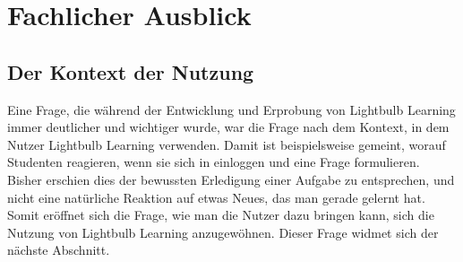 \section{Fachlicher Ausblick}
\subsection{Der Kontext der Nutzung}
Eine Frage, die während der Entwicklung und Erprobung von Lightbulb Learning immer deutlicher und wichtiger wurde, war die Frage nach dem Kontext, in dem Nutzer Lightbulb Learning verwenden. Damit ist beispielsweise gemeint, worauf Studenten reagieren, wenn sie sich in einloggen und eine Frage formulieren. Bisher erschien dies der bewussten Erledigung einer Aufgabe zu entsprechen, und nicht eine natürliche Reaktion auf etwas Neues, das man gerade gelernt hat. Somit eröffnet sich die Frage, wie man die Nutzer dazu bringen kann, sich die Nutzung von Lightbulb Learning anzugewöhnen. Dieser Frage widmet sich der nächste Abschnitt.

